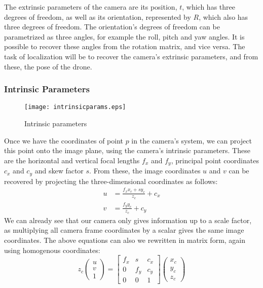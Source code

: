 The extrinsic parameters of the camera are its position, $t$, which has three degrees of freedom, as well as its orientation, represented by $R$, which also has three degrees of freedom. The orientation's degrees of freedom can be parametrized as three angles, for example the roll, pitch and yaw angles. It is possible to recover these angles from the rotation matrix, and vice versa. The task of localization will be to recover the camera's extrinsic parameters, and from these, the pose of the drone.

\subsubsection{Intrinsic Parameters}
\begin{figure}[H]
  \centering
  \texttt{[image: intrinsicparams.eps]}
  \caption{Intrinsic parameters}
  \label{fig:pincam_int}
\end{figure}
Once we have the coordinates of point $p$ in the camera's system, we can project this point onto the image plane, using the camera's intrinsic parameters. These are the horizontal and vertical focal lengths $f_x$ and $f_y$, principal point coordinates $c_x$ and $c_y$ and skew factor $s$. From these, the image coordinates $u$ and $v$ can be recovered by projecting the three-dimensional coordinates as follows:
\begin{align}
  u &= \frac{f_xx_c + sy_c}{z_c} + c_x\\
  v &= \frac{f_yy_c}{z_c} + c_y
\end{align}
We can already see that our camera only gives information up to a scale factor, as multiplying all camera frame coordinates by a scalar gives the same image coordinates. The above equations can also we rewritten in matrix form, again using homogenous coordinates:
\begin{equation}
  z_c \begin{pmatrix} u\\v\\1 \end{pmatrix} =
  \begin{bmatrix}
  f_x & s   & c_x \\
  0   & f_y & c_y \\
  0   & 0   & 1
  \end{bmatrix} \begin{pmatrix} x_c\\y_c\\z_c \end{pmatrix}
\end{equation}
